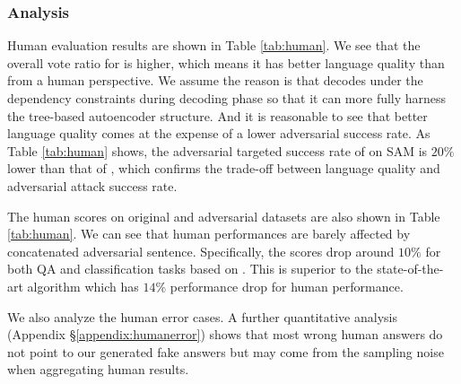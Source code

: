\subsubsection{Analysis}

Human evaluation results are shown in Table \ref{tab:human}. We see that the overall vote ratio for \advcodecsent is higher, which means it has better language quality than \advcodecword from a human perspective.
We assume the reason is that \advcodecsent decodes under the dependency constraints during decoding phase so that it can more fully harness the tree-based autoencoder structure. And it is reasonable to see that better language quality comes at the expense of a lower adversarial success rate. As Table \ref{tab:human} shows, the adversarial targeted success rate of \advcodecsent on SAM is $20\%$ lower than that of \advcodecword, which confirms the trade-off between language quality and adversarial attack success rate.

The human scores on original and adversarial datasets are also shown in Table \ref{tab:human}. We can see that human performances are barely affected by concatenated adversarial sentence.
Specifically, the scores drop around $10\%$ for both QA and classification tasks based on \advcodec. This is superior to the state-of-the-art algorithm \citep{jia-liang-2017-adversarial} which has $14\%$ performance drop for human performance.

We also analyze the human error cases. A further quantitative analysis (Appendix \S \ref{appendix:humanerror}) shows that most wrong human answers do not point to our generated fake answers but may come from the sampling noise when aggregating human results. 

